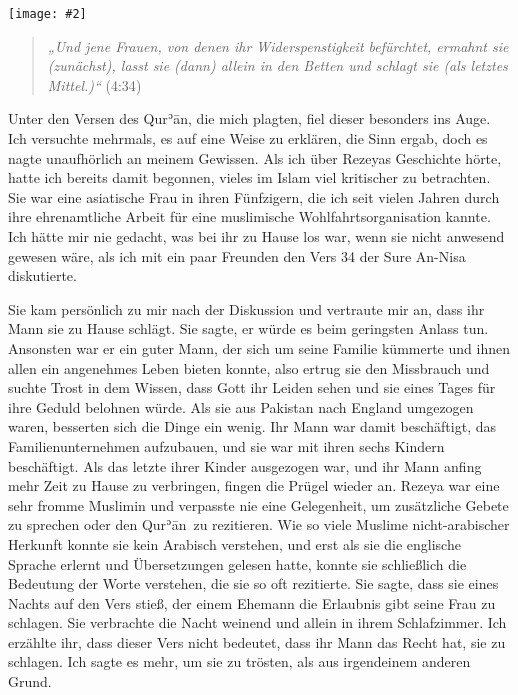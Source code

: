 \documentclass[12pt]{memoir}
\def\´{ʾ} %
\def \Quran{Qur\-\´ān} %
\newcommand{\QRef}[1]{{\color{darkblue}#1}}
\newcommand{\img}[3]{\begin{center}%
\texttt{[image: \#2]}\\{\small\em#3}%
\end{center}}
\begin{document}
\img{scale=0.6}{Man_Reading_Koran.jpg}{}

\begin{quote}
\emph{„Und jene Frauen, von denen ihr Widerspenstigkeit befürchtet,
ermahnt sie (zunächst), lasst sie (dann) allein in den Betten
und schlagt sie (als letztes Mittel.)“}
(\QRef{4:34})
\end{quote}

Unter den Versen des \Quran, die mich plagten,
fiel dieser besonders ins Auge.
Ich versuchte mehrmals, es auf eine Weise zu erklären, die Sinn ergab,
doch es nagte unaufhörlich an meinem Gewissen.
Als ich über Rezeyas Geschichte hörte,
hatte ich bereits damit begonnen,
vieles im Islam viel kritischer zu betrachten.
Sie war eine asiatische Frau in ihren Fünfzigern,
die ich seit vielen Jahren durch ihre ehrenamtliche Arbeit
für eine muslimische Wohlfahrtsorganisation kannte.
Ich hätte mir nie gedacht, was bei ihr zu Hause los war,
wenn sie nicht anwesend gewesen wäre,
als ich mit ein paar Freunden den Vers 34 der Sure An-Nisa diskutierte.

Sie kam persönlich zu mir nach der Diskussion und vertraute mir an,
dass ihr Mann sie zu Hause schlägt.
Sie sagte, er würde es beim geringsten Anlass tun.
Ansonsten war er ein guter Mann,
der sich um seine Familie kümmerte
und ihnen allen ein angenehmes Leben bieten konnte,
also ertrug sie den Missbrauch und suchte Trost in dem Wissen,
dass Gott ihr Leiden sehen
und sie eines Tages für ihre Geduld belohnen würde.
Als sie aus Pakistan nach England umgezogen waren,
besserten sich die Dinge ein wenig.
Ihr Mann war damit beschäftigt, das Familienunternehmen aufzubauen,
und sie war mit ihren sechs Kindern beschäftigt.
Als das letzte ihrer Kinder ausgezogen war,
und ihr Mann anfing mehr Zeit zu Hause zu verbringen,
fingen die Prügel wieder an.
Rezeya war eine sehr fromme Muslimin und verpasste nie eine Gelegenheit,
um zusätzliche Gebete zu sprechen oder den \Quran\ zu rezitieren.
Wie so viele Muslime nicht-arabischer Herkunft
konnte sie kein Arabisch verstehen,
und erst als sie die englische Sprache erlernt
und Übersetzungen gelesen hatte,
konnte sie schließlich die Bedeutung der Worte verstehen,
die sie so oft rezitierte.
Sie sagte, dass sie eines Nachts auf den Vers stieß,
der einem Ehemann die Erlaubnis gibt seine Frau zu schlagen.
Sie verbrachte die Nacht weinend und allein in ihrem Schlafzimmer.
Ich erzählte ihr, dass dieser Vers nicht bedeutet,
dass ihr Mann das Recht hat, sie zu schlagen.
Ich sagte es mehr, um sie zu trösten, als aus irgendeinem anderen Grund.
\end{document}
